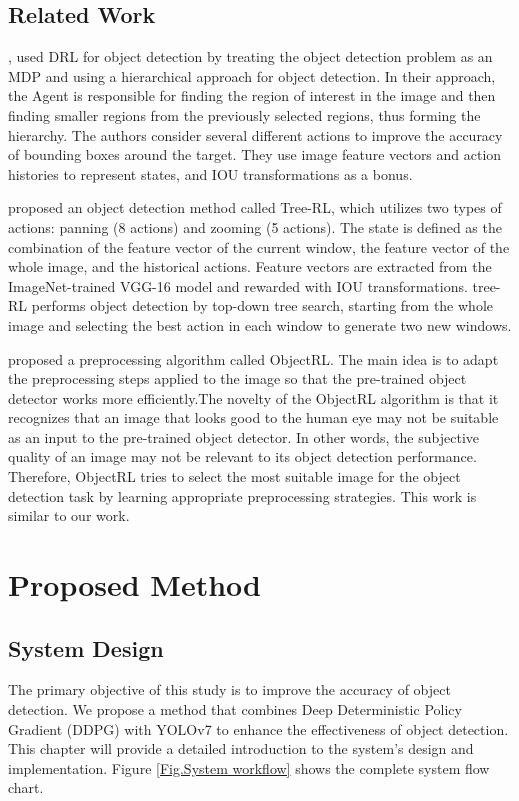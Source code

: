 \documentclass{PHlab-thesis}
\begin{document}
\section{Related Work}
\cite{caicedo2015active}, \cite{bueno2017hierarchical} used DRL for object detection by treating the object detection problem as an MDP and using a hierarchical approach for object detection. In their approach, the Agent is responsible for finding the region of interest in the image and then finding smaller regions from the previously selected regions, thus forming the hierarchy. The authors consider several different actions to improve the accuracy of bounding boxes around the target. They use image feature vectors and action histories to represent states, and IOU transformations as a bonus.

\cite{jie2016tree} proposed an object detection method called Tree-RL, which utilizes two types of actions: panning (8 actions) and zooming (5 actions). The state is defined as the combination of the feature vector of the current window, the feature vector of the whole image, and the historical actions. Feature vectors are extracted from the ImageNet-trained VGG-16 model and rewarded with IOU transformations. tree-RL performs object detection by top-down tree search, starting from the whole image and selecting the best action in each window to generate two new windows.

\cite{nayak2020reinforcement} proposed a preprocessing algorithm called ObjectRL. The main idea is to adapt the preprocessing steps applied to the image so that the pre-trained object detector works more efficiently.The novelty of the ObjectRL algorithm is that it recognizes that an image that looks good to the human eye may not be suitable as an input to the pre-trained object detector. In other words, the subjective quality of an image may not be relevant to its object detection performance. Therefore, ObjectRL tries to select the most suitable image for the object detection task by learning appropriate preprocessing strategies. This work is similar to our work.


\chapter{Proposed Method}
\section{System Design}
The primary objective of this study is to improve the accuracy of object detection. We propose a method that combines Deep Deterministic Policy Gradient (DDPG) with YOLOv7 to enhance the effectiveness of object detection. This chapter will provide a detailed introduction to the system's design and implementation. Figure \ref{Fig.System workflow} shows the complete system flow chart.
\end{document}
